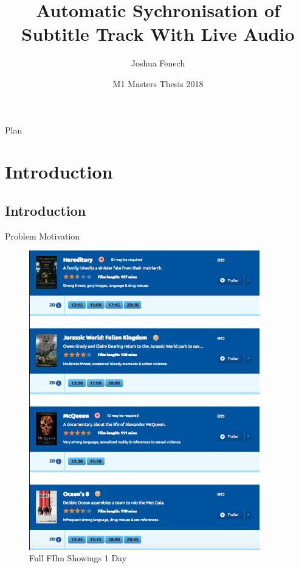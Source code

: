\documentclass[notes]{beamer}
\title[Patterns for SoS Reconfiguration] 
{Automatic Sychronisation of Subtitle Track With Live Audio}
\author[Joshua Fenech] 
{Joshua Fenech}
\institute[]
{
	MLDM\\
	Universit\'e de Jean Monnet\\
	Saint-\'Etienne, France
}
\date[SESOS 2015] 
{M1 Masters Thesis 2018}
\begin{document}
\begin{frame}
  \titlepage
\end{frame}

\begin{frame}{Plan}
  \tableofcontents
\end{frame}

\section{Introduction}

\subsection{Introduction}


\begin{frame}{Problem Motivation}
\begin{figure}
	\centering
	\begin{minipage}{0.45\textwidth}
		\centering
		\includegraphics[width=0.9\textwidth]{figures/ALLMOVIESLONDONFULL} %
		\caption{Full FIlm Showings 1 Day}
	\end{minipage}\hfill
	\begin{minipage}{0.45\textwidth}
		\centering
	\end{minipage}
\end{figure}
\end{frame}
\end{document}
